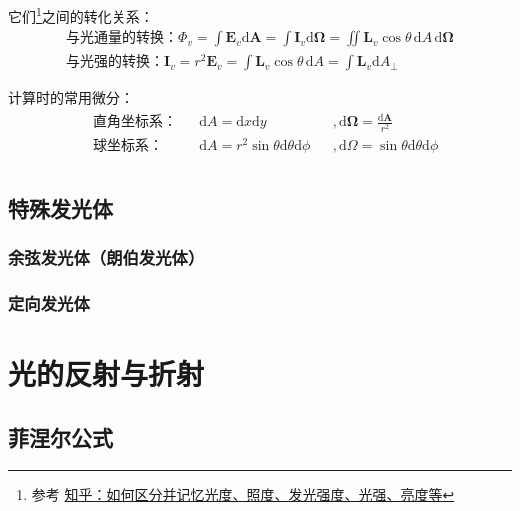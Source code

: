 \documentclass[UTF8]{report}
\theoremstyle{MyLineTheoremStyle} %
\theoremstyle{MyBlockTheoremStyle} %
\theoremstyle{MySubsubsectionStyle} %
\begin{document}
它们\footnote{参考 \href{https://www.zhihu.com/question/53080536/answer/133398317}{知乎：如何区分并记忆光度、照度、发光强度、光强、亮度等}}之间的转化关系：
\begin{gather}
\text{与光通量的转换：} \Phi_v = \int \boldsymbol{E}_v \mathrm{d}\boldsymbol{A} = \int \boldsymbol{I}_v \mathrm{d}\boldsymbol{\Omega} = \iint \boldsymbol{L}_v \cos \theta\, \mathrm{d}A \,\mathrm{d} \boldsymbol{\Omega} \\ 
\text{与光强的转换：} \boldsymbol{I}_v = r^2\boldsymbol{E}_v = \int \boldsymbol{L}_v \cos \theta\, \mathrm{d}A = \int \boldsymbol{L}_v  \mathrm{d}A_{\perp}
\end{gather}

计算时的常用微分：
\begin{gather}
\begin{aligned}
    & \text{直角坐标系：}&& \mathrm{d}A = \mathrm{d}x \mathrm{d}y &&,  \mathrm{d}\boldsymbol{\Omega} = \frac{\mathrm{d}\boldsymbol{A}}{r^2} \\ 
    & \text{球坐标系：}&& \mathrm{d}A = r^2 \sin \theta \mathrm{d}\theta \mathrm{d}\phi &&,\mathrm{d}\Omega = \sin \theta \mathrm{d}\theta \mathrm{d}\phi \\ 
\end{aligned}
\end{gather}

\section{特殊发光体}

\subsection{余弦发光体（朗伯发光体）}

\subsection{定向发光体}

\chapter{光的反射与折射}\thispagestyle{fancy}

\section{菲涅尔公式}
\end{document}
